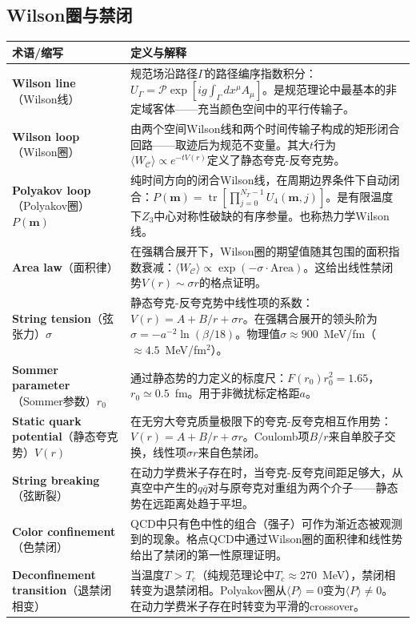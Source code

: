 \documentclass[12pt,a4paper]{ctexart}
\begin{document}
\subsection*{Wilson圈与禁闭}

\begin{longtable}{p{3.5cm}p{9cm}}
\toprule
\textbf{术语/缩写} & \textbf{定义与解释} \\
\midrule
\endhead
\textbf{Wilson line}（Wilson线）& 规范场沿路径$\Gamma$的路径编序指数积分：$U_\Gamma = \mathcal{P}\exp[ig\int_\Gamma dx^\mu A_\mu]$。是规范理论中最基本的非定域客体——充当颜色空间中的平行传输子。\\
\textbf{Wilson loop}（Wilson圈）& 由两个空间Wilson线和两个时间传输子构成的矩形闭合回路——取迹后为规范不变量。其大$t$行为$\langle W_{\mathcal{C}}\rangle \propto e^{-tV(r)}$定义了静态夸克-反夸克势。\\
\textbf{Polyakov loop}（Polyakov圈）$P(\mathbf{m})$& 纯时间方向的闭合Wilson线，在周期边界条件下自动闭合：$P(\mathbf{m}) = \operatorname{tr}[\prod_{j=0}^{N_T-1} U_4(\mathbf{m}, j)]$。是有限温度下$Z_3$中心对称性破缺的有序参量。也称热力学Wilson线。\\
\textbf{Area law}（面积律）& 在强耦合展开下，Wilson圈的期望值随其包围的面积指数衰减：$\langle W_{\mathcal{C}}\rangle \propto \exp(-\sigma \cdot \text{Area})$。这给出线性禁闭势$V(r) \sim \sigma r$的格点证明。\\
\textbf{String tension}（弦张力）$\sigma$& 静态夸克-反夸克势中线性项的系数：$V(r) = A + B/r + \sigma r$。在强耦合展开的领头阶为$\sigma = -a^{-2}\ln(\beta/18)$。物理值$\sigma \approx 900$~MeV/fm（$\approx 4.5$~MeV/fm$^2$）。\\
\textbf{Sommer parameter}（Sommer参数）$r_0$& 通过静态势的力定义的标度尺：$F(r_0)r_0^2 = 1.65$，$r_0 \simeq 0.5$~fm。用于非微扰标定格距$a$。\\
\textbf{Static quark potential}（静态夸克势）$V(r)$& 在无穷大夸克质量极限下的夸克-反夸克相互作用势：$V(r) = A + B/r + \sigma r$。Coulomb项$B/r$来自单胶子交换，线性项$\sigma r$来自色禁闭。\\
\textbf{String breaking}（弦断裂）& 在动力学费米子存在时，当夸克-反夸克间距足够大，从真空中产生的$q\bar{q}$对与原夸克对重组为两个介子——静态势在远距离处趋于平坦。\\
\textbf{Color confinement}（色禁闭）& QCD中只有色中性的组合（强子）可作为渐近态被观测到的现象。格点QCD中通过Wilson圈的面积律和线性势给出了禁闭的第一性原理证明。\\
\textbf{Deconfinement transition}（退禁闭相变）& 当温度$T > T_c$（纯规范理论中$T_c \approx 270$~MeV），禁闭相转变为退禁闭相。Polyakov圈从$\langle P\rangle = 0$变为$\langle P\rangle \neq 0$。在动力学费米子存在时转变为平滑的crossover。\\

\end{longtable}
\end{document}
